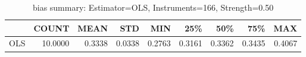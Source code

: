 \begin{table}[ht]
\centering
\caption{bias summary: Estimator=OLS, Instruments=166, Strength=0.50}
\begin{tabular}{lrrrrrrrr}
\toprule
 & COUNT & MEAN & STD & MIN & 25\% & 50\% & 75\% & MAX \\
\midrule
OLS & 10.0000 & 0.3338 & 0.0338 & 0.2763 & 0.3161 & 0.3362 & 0.3435 & 0.4067 \\
\bottomrule
\end{tabular}
\end{table}
